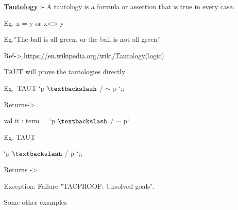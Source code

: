 \documentclass[12pt]{article}
\renewcommand{\_}{\kern-1.5pt\textunderscore\kern-1.5pt}
\begin{document}
{\fontsize{13pt}{15.6pt}\selectfont \textbf{\uline{Tautology}} :- A tautology is a formula or assertion that is true in every case.\par}\par

{\fontsize{13pt}{15.6pt}\selectfont Eg. x = y or x<> y\par}\par

{\fontsize{13pt}{15.6pt}\selectfont Eg.\textcolor[HTML]{1A1A1A}{"The ball is all green, or the ball is not all green"}\par}\par

{\fontsize{13pt}{15.6pt}\selectfont Ref->\href{https://en.wikipedia.org/wiki/Tautology_(logic)}{ }\href{https://en.wikipedia.org/wiki/Tautology_(logic)}{\textcolor[HTML]{0000E9}{\ul{https://en.wikipedia.org/wiki/Tautology\_(logic)}}}\par}\par

\textcolor[HTML]{0000E9}{\uline{ }}\par

{\fontsize{13pt}{15.6pt}\selectfont TAUT will prove the tautologies directly\par}\par

{\fontsize{13pt}{15.6pt}\selectfont Eg.\ TAUT  `p $\textbackslash$ / $ \sim $ p `;;\par}\par

{\fontsize{13pt}{15.6pt}\selectfont Returns-> {\fontsize{14pt}{16.8pt}\selectfont val it : term = `p $\textbackslash$ / $ \sim $ p`\par}\par}\par

{\fontsize{14pt}{16.8pt}\selectfont Eg. TAUT {\fontsize{13pt}{15.6pt}\selectfont  `p $\textbackslash$ / p `;;\par}\par}\par

{\fontsize{13pt}{15.6pt}\selectfont Returns -> {\fontsize{14pt}{16.8pt}\selectfont Exception: Failure "TAC\_PROOF: Unsolved goals".\par}\par}\par

 \par

{\fontsize{13pt}{15.6pt}\selectfont Some other examples\par}\par
\end{document}

